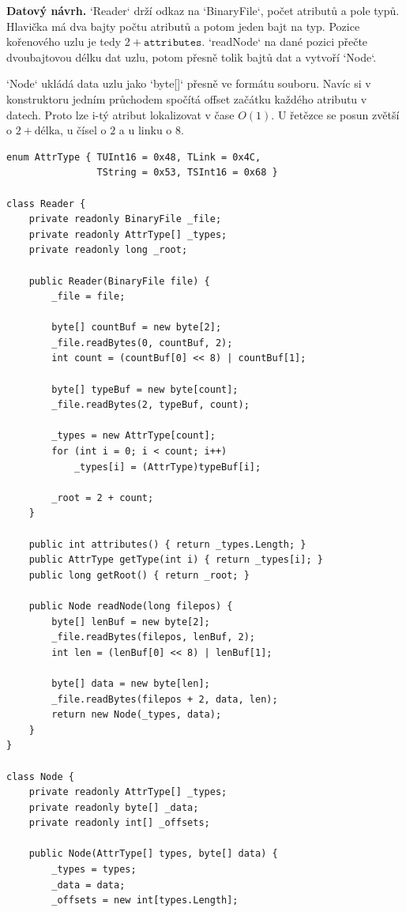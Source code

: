 \begin{odpoved}
\textbf{Datový návrh.} `Reader` drží odkaz na `BinaryFile`, počet atributů a pole typů.
Hlavička má dva bajty počtu atributů a potom jeden bajt na typ. Pozice kořenového uzlu je
tedy $2+\texttt{attributes}$. `readNode` na dané pozici přečte dvoubajtovou délku dat uzlu,
potom přesně tolik bajtů dat a vytvoří `Node`.

`Node` ukládá data uzlu jako `byte[]` přesně ve formátu souboru. Navíc si v konstruktoru
jedním průchodem spočítá offset začátku každého atributu v datech. Proto lze i-tý atribut
lokalizovat v čase $O(1)$. U řetězce se posun zvětší o $2+\text{délka}$, u čísel o $2$ a u
linku o $8$.

\begin{verbatim}
enum AttrType { TUInt16 = 0x48, TLink = 0x4C,
                TString = 0x53, TSInt16 = 0x68 }

class Reader {
    private readonly BinaryFile _file;
    private readonly AttrType[] _types;
    private readonly long _root;

    public Reader(BinaryFile file) {
        _file = file;

        byte[] countBuf = new byte[2];
        _file.readBytes(0, countBuf, 2);
        int count = (countBuf[0] << 8) | countBuf[1];

        byte[] typeBuf = new byte[count];
        _file.readBytes(2, typeBuf, count);

        _types = new AttrType[count];
        for (int i = 0; i < count; i++)
            _types[i] = (AttrType)typeBuf[i];

        _root = 2 + count;
    }

    public int attributes() { return _types.Length; }
    public AttrType getType(int i) { return _types[i]; }
    public long getRoot() { return _root; }

    public Node readNode(long filepos) {
        byte[] lenBuf = new byte[2];
        _file.readBytes(filepos, lenBuf, 2);
        int len = (lenBuf[0] << 8) | lenBuf[1];

        byte[] data = new byte[len];
        _file.readBytes(filepos + 2, data, len);
        return new Node(_types, data);
    }
}

class Node {
    private readonly AttrType[] _types;
    private readonly byte[] _data;
    private readonly int[] _offsets;

    public Node(AttrType[] types, byte[] data) {
        _types = types;
        _data = data;
        _offsets = new int[types.Length];


\end{verbatim}
\end{odpoved}
